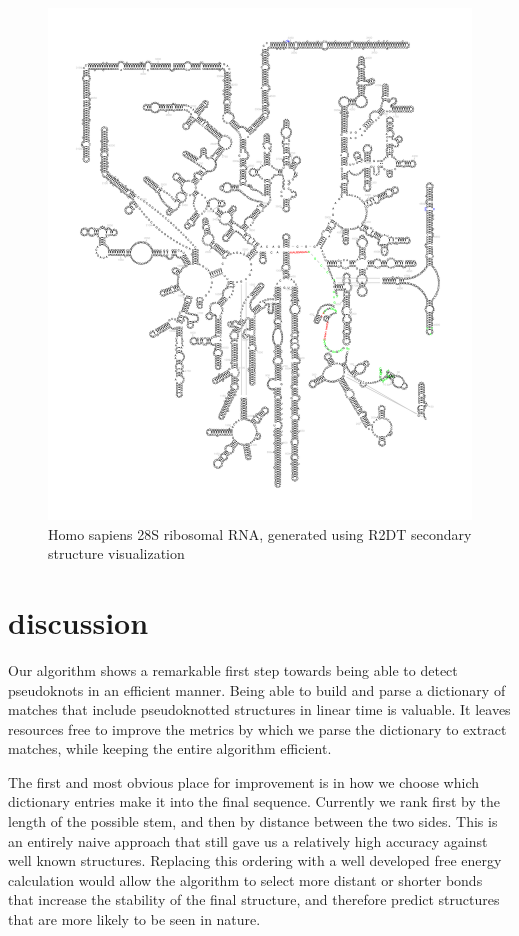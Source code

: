\documentclass[sigconf]{acmart}
\begin{document}
\begin{figure}
  \includegraphics[width=\linewidth]{for_paper2.png}
  \caption{Homo sapiens 28S ribosomal RNA, generated using R2DT secondary structure visualization}
  \label{fig:ribosomal}
\end{figure}


\section{discussion}

Our algorithm shows a remarkable first step towards being able to detect pseudoknots in an efficient manner. Being able to build and parse a dictionary of matches that include pseudoknotted structures in linear time is valuable. It leaves resources free to improve the metrics by which we parse the dictionary to extract matches, while keeping the entire algorithm efficient. 

The first and most obvious place for improvement is in how we choose which dictionary entries make it into the final sequence. Currently we rank first by the length of the possible stem, and then by distance between the two sides. This is an entirely naive approach that still gave us a relatively high accuracy against well known structures. Replacing this ordering with a well developed free energy calculation would allow the algorithm to select more distant or shorter bonds that increase the stability of the final structure, and therefore predict structures that are more likely to be seen in nature.
\end{document}

